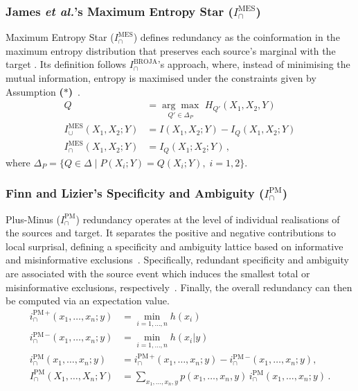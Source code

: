 \documentclass{article}
\makeatletter
\newcommand{\etalx}{\textit{et al.\@}\xspace}
\newcommand{\XsY}{X_1,\ldots,X_n;Y}
\newcommand{\AST}{\textbf{($\boldsymbol{\ast}$)}\xspace} %
\newcommand{\IBROJA}{\ensuremath{I_\cap^{\text{BROJA}}}\xspace}
\newcommand{\IPM}{\ensuremath{I_\cap^{\text{PM}}}\xspace}
\newcommand{\IMES}{\ensuremath{I_\cap^{\text{MES}}}\xspace}
\makeatother
\begin{document}
\subsubsection*{James \etalx's Maximum Entropy Star ($\IMES$)}
Maximum Entropy Star ($\IMES$) defines redundancy as the coinformation in the maximum entropy distribution that preserves each source’s marginal with the target \cite{james2018uniquekey}. Its definition follows $\IBROJA$'s approach, where, instead of minimising the mutual information, entropy is maximised under the constraints given by Assumption \AST~\cite{bertschinger2014quantifying}. 
\begin{align}
    Q & = \underset{Q'\in\Delta_P}{\arg\max}\,\, H_{Q'}(X_1,X_2,Y) \\
    I_\cup^{\text{MES}}(X_1,X_2;Y) & = I(X_1,X_2;Y) - I_Q(X_1,X_2;Y) \\
    \IMES(X_1,X_2;Y) & = I_Q(X_1;X_2;Y) \,,
\end{align}
where $\Delta_P=\{Q\in\Delta \;|\; P(X_i;Y)=Q(X_i;Y) ,\;i=1,2\}$.

\subsubsection*{Finn and Lizier's Specificity and Ambiguity ($\IPM$)}
Plus-Minus (\IPM) redundancy operates at the level of individual realisations of the sources and target. It separates the positive and negative contributions to local surprisal, defining a specificity and ambiguity lattice based on informative and misinformative exclusions~\cite{finn2018probability}. Specifically, redundant specificity and ambiguity are associated with the source event which induces the smallest total or misinformative exclusions, respectively~\cite{finn2018pointwise}.
Finally, the overall redundancy can then be computed via an expectation value. 
\begin{align}
    i_\cap^{\text{PM}\,+}(x_1,\ldots,x_n;y) & = \min_{i=1,\ldots,n} h(x_i) \\
    i_\cap^{\text{PM}\,-}(x_1,\ldots,x_n;y) & = \min_{i=1,\ldots,n} h(x_i|y) \\
    i^{\text{PM}}_{\cap}(x_1,\ldots,x_n;y)&= i^{\text{PM}\,+}_{\cap}(x_1,\ldots,x_n;y)- i^{\text{PM}\,-}_{\cap}(x_1,\ldots,x_n;y), \\
I^{\text{PM}}_\cap(\XsY) & = \sum_{x_1,\ldots,x_n,y} p(x_1,\ldots,x_n,y)\, i_\cap^\text{PM}(x_1,\ldots,x_n;y) \,.
\end{align}
\end{document}
